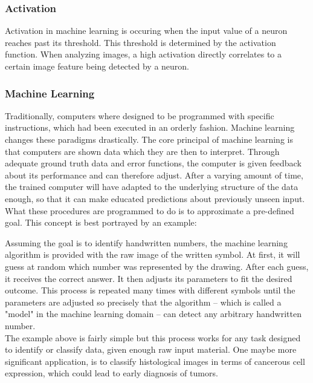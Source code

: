 \documentclass{acmsiggraph}               %
\begin{document}
\subsubsection{Activation}
Activation in machine learning is occuring when the input value of a neuron reaches past its threshold. This threshold is determined by the activation function. When analyzing images, a high activation directly correlates to a certain image feature being detected by a neuron.


\subsubsection{Machine Learning}
Traditionally, computers where designed to be programmed with specific instructions, which had been executed in an orderly fashion.
Machine learning changes these paradigms drastically. The core principal of machine learning is that computers are shown data which they are then to interpret. Through adequate ground truth data and error functions, the computer is given feedback about its performance and can therefore adjust. After a varying amount of time, the trained computer will have adapted to the underlying structure of the data enough, so that it can make educated predictions about previously unseen input. What these procedures are programmed to do is to approximate a pre-defined goal. This concept is best portrayed by an example:

Assuming the goal is to identify handwritten numbers, the machine learning algorithm is provided with the raw image of the written symbol. At first, it will guess at random which number was represented by the drawing. 
After each guess, it receives the correct answer. It then adjusts its parameters to fit the desired outcome.
This process is repeated many times with different symbols until the parameters are adjusted so precisely that the algorithm -- which is called a "model" in the machine learning domain -- can detect any arbitrary handwritten number.\\

The example above is fairly simple but this process works for any task designed to identify or classify data, given enough raw input material. One maybe more significant application, is to classify histological images in terms of cancerous cell expression, which could lead to early diagnosis of tumors.
\end{document}
